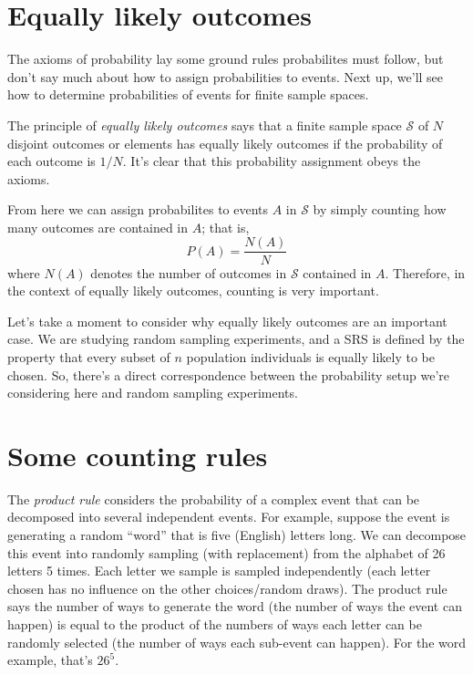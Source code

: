 \documentclass[]{book}
\begin{document}
\section{Equally likely outcomes}\label{equally-likely-outcomes}

The axioms of probability lay some ground rules probabilites must
follow, but don't say much about how to assign probabilities to events.
Next up, we'll see how to determine probabilities of events for finite
sample spaces.

The principle of \emph{equally likely outcomes} says that a finite
sample space \(\mathcal{S}\) of \(N\) disjoint outcomes or elements has
equally likely outcomes if the probability of each outcome is \(1/N\).
It's clear that this probability assignment obeys the axioms.

From here we can assign probabilites to events \(A\) in \(\mathcal{S}\)
by simply counting how many outcomes are contained in \(A\); that is,
\[P(A) = \frac{N(A)}{N}\] where \(N(A)\) denotes the number of outcomes
in \(\mathcal{S}\) contained in \(A\). Therefore, in the context of
equally likely outcomes, counting is very important.

Let's take a moment to consider why equally likely outcomes are an
important case. We are studying random sampling experiments, and a SRS
is defined by the property that every subset of \(n\) population
individuals is equally likely to be chosen. So, there's a direct
correspondence between the probability setup we're considering here and
random sampling experiments.

\section{Some counting rules}\label{some-counting-rules}

The \emph{product rule} considers the probability of a complex event
that can be decomposed into several independent events. For example,
suppose the event is generating a random ``word'' that is five (English)
letters long. We can decompose this event into randomly sampling (with
replacement) from the alphabet of 26 letters 5 times. Each letter we
sample is sampled independently (each letter chosen has no influence on
the other choices/random draws). The product rule says the number of
ways to generate the word (the number of ways the event can happen) is
equal to the product of the numbers of ways each letter can be randomly
selected (the number of ways each sub-event can happen). For the word
example, that's \(26^5\).
\end{document}
